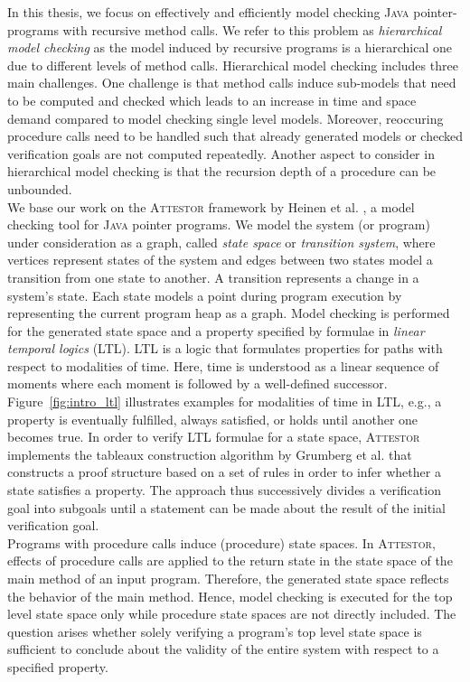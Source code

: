 \documentclass[a4paper, 12pt, twoside]{report}
\begin{document}
	In this thesis, we focus on effectively and efficiently model checking \textsc{Java} pointer-programs with recursive method calls. We refer to this problem as \textit{hierarchical model checking} as the model induced by recursive programs is a hierarchical one due to different levels of method calls. Hierarchical model checking includes three main challenges. One challenge is that method calls induce sub-models that need to be computed and checked which leads to an increase in time and space demand compared to model checking single level models. Moreover, reoccuring procedure calls need to be handled such that already generated models or checked verification goals are not computed repeatedly. Another aspect to consider in hierarchical model checking is that the recursion depth of a procedure can be unbounded.\\ 	
	
	We base our work on the \textsc{Attestor} framework by Heinen et al. \cite{heinen2015juggrnaut}, a model checking tool for \textsc{Java} pointer programs. We model the system (or program) under consideration as a graph, called \textit{state space} or \textit{transition system}, where vertices represent states of the system and edges between two states model a transition from one state to another. A transition represents a change in a system's state. Each state models a point during program execution by representing the current program heap as a graph. Model checking is performed for the generated state space and a property specified by formulae in \textit{linear temporal logics} (LTL). LTL is a logic that formulates properties for paths with respect to modalities of time. Here, time is understood as a linear sequence of moments where each moment is followed by a well-defined successor. Figure~\ref{fig:intro_ltl} illustrates examples for modalities of time in LTL, e.g., a property is eventually fulfilled, always satisfied, or holds until another one becomes true. In order to verify LTL formulae for a state space, \textsc{Attestor} implements the tableaux construction algorithm by Grumberg et al. \cite{bhat1995efficient} that constructs a proof structure based on a set of rules in order to infer whether a state satisfies a property. The approach thus successively divides a verification goal into subgoals until a statement can be made about the result of the initial verification goal.\\	
	
	Programs with procedure calls induce (procedure) state spaces. In \textsc{Attestor}, effects of procedure calls are applied to the return state in the state space of the main method of an input program. Therefore, the generated state space reflects the behavior of the main method. Hence, model checking is executed for the top level state space only while procedure state spaces are not directly included. The question arises whether solely verifying a program's top level state space is sufficient to conclude about the validity of the entire system with respect to a specified property.\\ 
	
\end{document}
